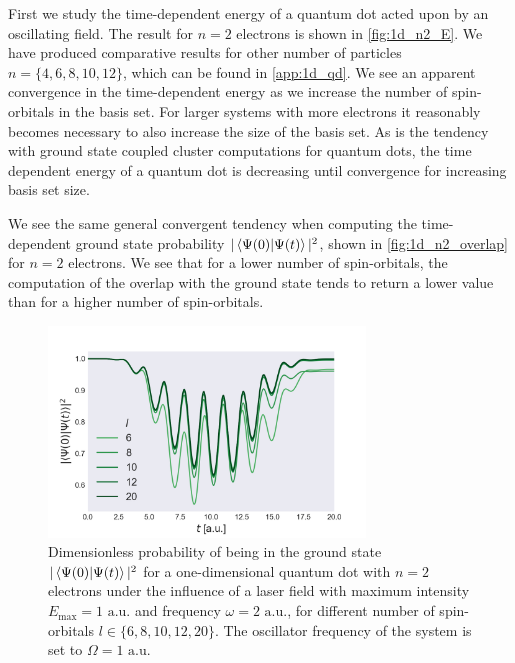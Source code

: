 First we study the time-dependent energy of a quantum dot acted upon by an oscillating 
field. The result for $n=2$ electrons is shown in \autoref{fig:1d_n2_E}. We have 
produced comparative results for other number of particles $n=\{4,6,8,10,12\}$,
which can be found in \autoref{app:1d_qd}. We see an apparent convergence in the 
time-dependent energy as we increase the number of spin-orbitals in the basis set.
For larger systems with more electrons it reasonably becomes necessary to also increase
the size of the basis set. As is the tendency with ground state coupled cluster computations
for quantum dots\cite{jorgensen2011many,lohne2010coupled}, the time dependent energy 
of a quantum dot is decreasing until convergence for increasing basis set size.

We see the same general convergent tendency when computing the time-dependent ground 
state probability $|\braket{\Psi(0)}{\Psi(t)}|^2$, shown in \autoref{fig:1d_n2_overlap} for $n=2$ electrons. We see that 
for a lower number of spin-orbitals, the computation of the overlap with 
the ground state tends to return a lower value than for a higher number of spin-orbitals.

\begin{figure}
    \centering
    \includegraphics[width=0.75\textwidth]{results/figures/1D/n=2overlap.png} 
    \caption{Dimensionless probability of being in the ground state $|\braket*{\Psi(0)}{\Psi(t)}|^2$
        for a one-dimensional quantum dot with $n=2$ electrons under 
        the influence of a laser field with maximum intensity $E_\text{max} = 1 \text{ a.u.}$
        and frequency $\omega = 2 \text{ a.u.}$, for different number of spin-orbitals 
        $l\in\{6,8,10,12,20\}$. The oscillator frequency of the system is set to
        $\Omega = 1 \text{ a.u.}$
    }
    \label{fig:1d_n2_overlap}
\end{figure}

